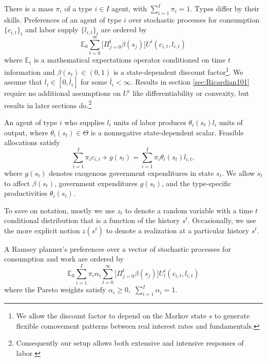 \documentclass[thmsb,11pt]{article}
\begin{document}
There is a mass $\pi _{i}$
of a type $i\in I$ agent, with $\sum_{i=1}^{I}\pi _{i}=1.$ Types differ by their skills.
Preferences of an
agent of type $i$ over stochastic processes for consumption $\{c_{i,t}\}_t$
and labor supply $\{l_{i,t}\}_t$ are ordered by
\begin{equation}
\mathbb{E}_{0}\sum_{t=0}^{\infty } \bigl[\Pi_{j=0}^t \beta(s_j)\bigr] U^{i}\left(
c_{i,t},l_{i,t}\right)  \label{utility lifetime}
\end{equation}%
where $\mathbb{E}_{t}$ is a mathematical expectations operator conditioned
on time $t$ information and $\beta(s_t) \in \left( 0,1\right) $ is a state-dependent discount
factor\footnote{We allow the discount factor to depend on the Markov state $s$ to generate flexible  comovement patterns between real interest rates and fundamentals. }. We assume that $l_{i}\in \left[ 0,\bar{l}_{i}\right] $ for some $%
\bar{l}_{i}<\infty .$ Results in section  \ref{sec:Ricardian101} require no
additional assumptions on $U^{i}$ like  differentiability or convexity, but results in later sections do.\footnote{Consequently  our setup allows both extensive and intensive responses of labor.}

An agent of type $i$ who supplies $l_{i}$ units of labor produces $\theta
_{i}\left( s_t\right) l_{i}$ units of output, where $\theta _{i}(s_t)\in \Theta $
is a nonnegative state-dependent scalar. Feasible allocations satisfy
\begin{equation}%
\sum_{i=1}^{I}\pi_{i}c_{i,t}+g\left( s_{t}\right) =\sum_{i=1}^{I}\pi
_{i}\theta _{i}\left( s_{t}\right) l_{i,t},  \label{feasibility goods}
\end{equation}%
where $g\left( s_{t}\right) $ denotes exogenous government expenditures in
state $s_{t}.$
 We allow $s_t$ to
affect $\beta(s_t)$, government expenditures $g(s_t)$, and the type-specific productivities $\theta_i(s_t)$.

To save on notation, mostly we
use $z_{t}$ to denote a random variable with a time $t$ conditional
distribution that is a function of the history $s^{t}$.
 Occasionally, we use the more explicit notion $z\left(
s^{t}\right) $ to denote a realization  at
a particular history $s^{t}.$


A Ramsey  planner's preferences over a vector of stochastic processes for consumption and
work are ordered by
\begin{equation}
\mathbb{E}_{0}\sum_{i=1}^{I}\pi _{i}\alpha _{i}\sum_{t=0}^{\infty }\bigl[\Pi_{j=0}^t \beta(s_j)\bigr] U_{t}^{i}\left( c_{i,t},l_{i,t}\right)  \label{govmt objective}
\end{equation}%
where the Pareto weights satisfy $\alpha _{i}\geq 0,$ $\sum_{i=1}^{I}\alpha _{i}=1$.
\end{document}
